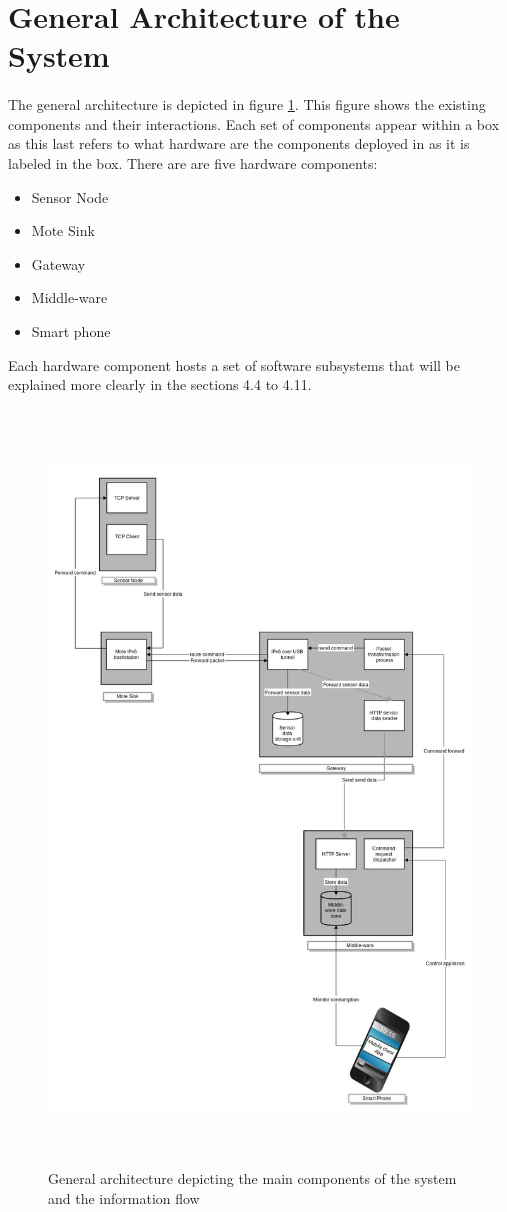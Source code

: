 \documentclass[oneside,12pt,a4paper,final]{book}
\begin{document}
\section{General Architecture of the System}
\paragraph{}
The general architecture is depicted in figure \ref{fig:gen_architecture}. This figure shows the existing components and their interactions. Each set of components appear within a box as this last refers to what hardware are the components deployed in as it is labeled in the box. There are are five hardware components:
\begin{itemize}
\item Sensor Node
\item Mote Sink
\item Gateway
\item Middle-ware
\item Smart phone
\end{itemize}
Each hardware component hosts a set of software subsystems that will be explained more clearly in the sections 4.4 to 4.11.
\begin{figure}[htbp]
\centering
\includegraphics[width=17cm,height=20cm,keepaspectratio]{img/general_architecture.jpg}
\caption{General architecture depicting the main components of the system and the information flow}
\label{fig:gen_architecture}
\end{figure}
\end{document}

